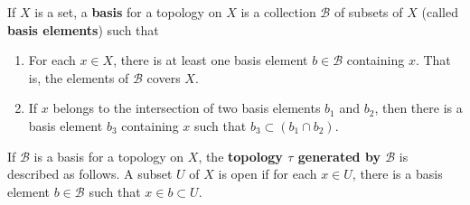 \documentclass{article}
\begin{document}
    \begin{definition}
    If $X$ is a set, a \textbf{basis} for a topology on $X$ is a collection $\mathscr{B}$ of subsets of $X$ (called \textbf{basis elements}) such that
    \begin{enumerate}
        \item For each $x \in X$, there is at least one basis element $b \in \mathscr{B}$ containing $x$. That is, the elements of $\mathscr{B}$ covers $X$. 
        \item If $x$ belongs to the intersection of two basis elements $b_1$ and $b_2$, then there is a basis element $b_3$ containing $x$ such that $b_3 \subset (b_1 \cap b_2)$. 
    \end{enumerate}
    \begin{center}
    \end{center}
    \end{definition}

    \begin{definition}
    If $\mathscr{B}$ is a basis for a topology on $X$, the \textbf{topology $\tau$ generated by $\mathscr{B}$} is described as follows. A subset $U$ of $X$ is open if for each $x \in U$, there is a basis element $b \in \mathscr{B}$ such that $x \in b \subset U$. 
    \end{definition}
    \begin{center}
    \end{center}
\end{document}

